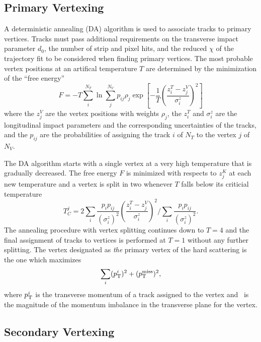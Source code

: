 \subsection{Primary Vertexing}
\label{sec:pf_pv}

A deterministic annealing (DA) algorithm is used to associate tracks to primary vertices.
Tracks must pass additional requirements on the transverse impact parameter $d_0$, the number of strip and pixel hits, and the reduced $\chi$ of the trajectory fit to be considered when finding primary vertices.
The most probable vertex positions at an artifical temperature $T$ are determined by the minimization of the ``free energy''
\begin{equation}
  F = -T \sum_i^{N_T} \ln \sum_j^{N_V} p_{ij} \rho_j \exp \left[ - \frac{1}{T} \left(\frac{z_i^T - z_j^V}{\sigma^z_i}\right)^2 \right]
\end{equation}
where the $z_j^V$ are the vertex positions with weights $\rho_j$, the $z_i^T$ and $\sigma_i^z$  are the longitudinal impact parameters and the corresponding uncertainties of the tracks, and the $p_{ij}$ are the probabilities of assigning the track $i$ of $N_T$ to the vertex $j$ of $N_V$.

The DA algorithm starts with a single vertex at a very high temperature that is gradually decreased.
The free energy $F$ is minimized with respects to $z_j^K$ at each new temperature and a vertex is split in two whenever $T$ falls below its criticial temperature
\begin{equation}
  T_C^j = 2 \sum_i \frac{p_i p_{ij}}{\left(\sigma_i^z\right)^2} \left(\frac{z_i^T - z_j^V}{\sigma^z_i}\right)^2 \Bigg/ \sum_i \frac{p_i p_{ij}}{\left(\sigma_i^z\right)^2}.
\end{equation}
The annealing procedure with vertex splitting continues down to $T = 4$ and the final assignment of tracks to vertices is performed at $T = 1$ without any further splitting. 
The vertex designated as \textit{the} primary vertex of the hard scattering is the one which maximizes
\begin{equation}
  \sum_i  (p_{\mathrm{T}}^i)^2 + (p_{\mathrm{T}}^\text{miss})^2,
  \end{equation}
where $p_{\mathrm{T}}^i$ is the transverse momentum of a track assigned to the vertex and \ptmiss\ is the magnitude of the momentum imbalance in the transverse plane for the vertex. 
\subsection{Secondary Vertexing}
\label{sec:pf_csv}

